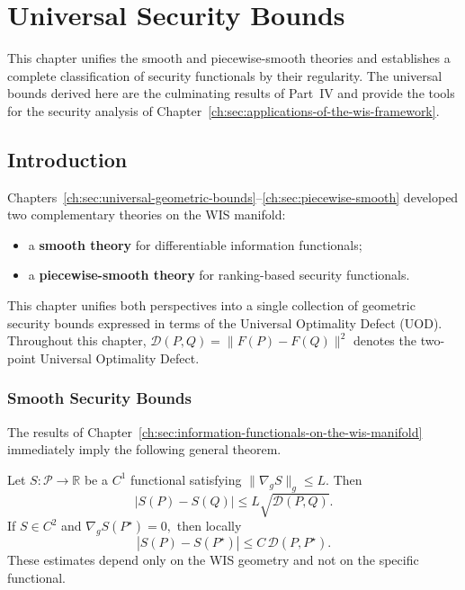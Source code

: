 \chapter[Universal Security Bounds]{Universal Security Bounds}\label{ch:sec:universal-security-bounds}

This chapter unifies the smooth and piecewise-smooth theories and establishes a complete classification of security functionals by their regularity. The universal bounds derived here are the culminating results of Part~IV and provide the tools for the security analysis of Chapter~\ref{ch:sec:applications-of-the-wis-framework}.


\section{Introduction}\label{ch:sec:introduction-piecewise-smooth-2}
Chapters~\ref{ch:sec:universal-geometric-bounds}--\ref{ch:sec:piecewise-smooth} developed two complementary theories on the WIS
manifold:
\begin{itemize}
\item a \textbf{smooth theory} for differentiable information functionals;
\item a \textbf{piecewise-smooth theory} for ranking-based security functionals.
\end{itemize}
This chapter unifies both perspectives into a single collection of
geometric security bounds expressed in terms of the Universal Optimality
Defect (UOD).
Throughout this chapter,
$\mathcal D(P,Q)=\|F(P)-F(Q)\|^2$
denotes the two-point Universal Optimality Defect.
\subsection{Smooth Security Bounds}\label{ch:thm:18-1}
The results of Chapter~\ref{ch:sec:information-functionals-on-the-wis-manifold} immediately imply the following general
theorem.
\begin{theorem}

Let $S:\mathcal P\rightarrow\mathbb R$ be a \(C^{1}\) functional satisfying
$\|\nabla_gS\|_g\le L.$
Then
\[ \boxed{
|S(P)-S(Q)|
\le
L\sqrt{\mathcal D(P,Q)}.
} \]
If \(S\in C^{2}\) and
$\nabla_gS(P^{\star})=0,$
then locally
\[ \boxed{
|S(P)-S(P^\star)|
\le
C\,\mathcal D(P,P^\star).
} \]
These estimates depend only on the WIS geometry and not on the specific
functional.
\end{theorem}

